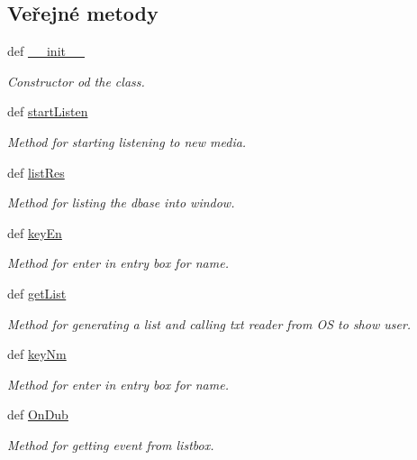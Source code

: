\subsection*{Veřejné metody}
\begin{DoxyCompactItemize}
\item 
def \hyperlink{classmnWindow_1_1App_ab0d57eebcf6c963177340604c8aa783a}{\-\_\-\-\_\-init\-\_\-\-\_\-}
\begin{DoxyCompactList}\small\item\em Constructor od the class. \end{DoxyCompactList}\item 
def \hyperlink{classmnWindow_1_1App_a0ae27dd2c076cc8bea3189d60c061a25}{start\-Listen}
\begin{DoxyCompactList}\small\item\em Method for starting listening to new media. \end{DoxyCompactList}\item 
def \hyperlink{classmnWindow_1_1App_a3224a0de9bd79c5213256b4da9e261ee}{list\-Res}
\begin{DoxyCompactList}\small\item\em Method for listing the dbase into window. \end{DoxyCompactList}\item 
def \hyperlink{classmnWindow_1_1App_a28eaa4c2614d33d923d97f7a365c4ec2}{key\-En}
\begin{DoxyCompactList}\small\item\em Method for enter in entry box for name. \end{DoxyCompactList}\item 
def \hyperlink{classmnWindow_1_1App_a9293245f3bbcd5eee738b923e948c281}{get\-List}
\begin{DoxyCompactList}\small\item\em Method for generating a list and calling txt reader from O\-S to show user. \end{DoxyCompactList}\item 
def \hyperlink{classmnWindow_1_1App_a7bd83a542a19260476e39415c73ff960}{key\-Nm}
\begin{DoxyCompactList}\small\item\em Method for enter in entry box for name. \end{DoxyCompactList}\item 
def \hyperlink{classmnWindow_1_1App_a4bd36c84cbc43fa9e27347ad7ec66ddd}{On\-Dub}
\begin{DoxyCompactList}\small\item\em Method for getting event from listbox. \end{DoxyCompactList}\item 

\end{DoxyCompactItemize}
